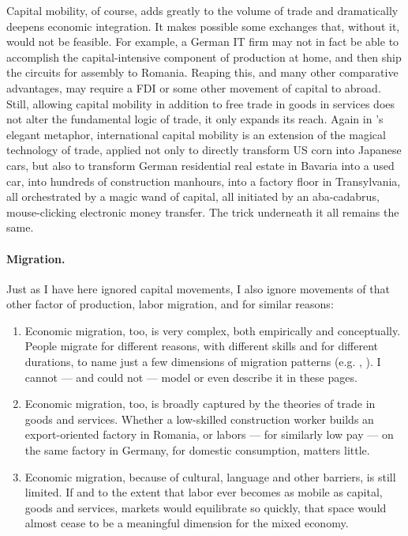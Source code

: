 \documentclass[11pt,a4paper,oneside,openright]{article}
\begin{document}
Capital mobility, of course, adds greatly to the volume of trade and dramatically deepens economic integration. 
It makes possible some exchanges that, without it, would not be feasible. 
For example, a German IT firm may not in fact be able to accomplish the capital-intensive component of production at home, and then ship the circuits for assembly to Romania. 
Reaping this, and many other comparative advantages, may require a \gls{FDI} or some other movement of capital to abroad. 
Still, allowing capital mobility in addition to free trade in goods in services does not alter the fundamental logic of trade, it only expands its reach. 
Again in \citeauthor{Mankiw-2004-aa}'s elegant metaphor, international capital mobility is an extension of the magical technology of trade, applied not only to directly transform US corn into Japanese cars, but also to transform German residential real estate in Bavaria into a used car, into hundreds of construction manhours, into a factory floor in Transylvania, all orchestrated by a magic wand of capital, all initiated by an aba-cadabrus, mouse-clicking electronic money transfer. 
The trick underneath it all remains the same.

\paragraph{Migration.} Just as I have here ignored capital movements, I also ignore movements of that other factor of production, labor migration, and for similar reasons:
\begin{enumerate}
	\item Economic migration, too, is very complex, both empirically and conceptually. 
	People migrate for different reasons, with different skills and for different durations, to name just a few dimensions of migration patterns (e.g. \citealt{DeSimone2008}, \citealt{Bems2008}). 
	I cannot --- and could not --- model or even describe it in these pages.
	\item Economic migration, too, is broadly captured by the theories of trade in goods and services. 
	Whether a low-skilled construction worker builds an export-oriented factory in Romania, or labors --- for similarly low pay --- on the same factory in Germany, for domestic consumption, matters little. 
	\item Economic migration, because of cultural, language and other barriers, is still limited. 
	If and to the extent that labor ever becomes as mobile as capital, goods and services, markets would equilibrate so quickly, that space would almost cease to be a meaningful dimension for the mixed economy.
\end{enumerate}
\end{document}
